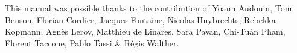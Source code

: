 \documentclass[Gaia]{../../data/TelemacDoc} %
\begin{document}
\let\cleardoublepage\clearpage

\setlength\parindent{0pt}

\title{\gaia}
\subtitle{User Manual}
\version{\telmaversion}
\date{\today}
\maketitle
\clearpage



\newpage

\thispagestyle{empty}

\TelemacCopyright{}




\pagestyle{empty} %

\tableofcontents%


\pagestyle{fancy} %

\pagebreak
This manual was possible thanks to the contribution of Yoann Audouin, Tom Benson, Florian Cordier, Jacques Fontaine, Nicolas Huybrechts, Rebekka Kopmann, Agn\`es Leroy, Matthieu de Linares, Sara Pavan, Chi-Tu\^an Pham, Florent Taccone, Pablo Tassi \& R\'egis Walther. %
\pagebreak



\end{document}

